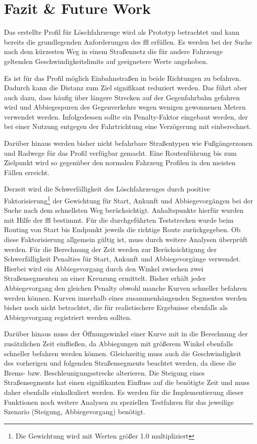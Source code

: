 \section{Fazit \& Future Work}

Das erstellte Profil für Löschfahrzeuge wird als Prototyp betrachtet und kann bereits die grundlegenden Anforderungen des \gls{ffl} erfüllen.
Es werden bei der Suche nach dem kürzesten Weg in einem Straßennetz die für andere Fahrzeuge geltenden Geschwindigkeitslimits auf geeignetere Werte angehoben.

Es ist für das Profil möglich Einbahnstraßen in beide Richtungen zu befahren.
Dadurch kann die Distanz zum Ziel signifikant reduziert werden.
Das führt aber auch dazu, dass häufig über längere Strecken auf der Gegenfahrbahn gefahren wird und Abbiegespuren des Gegenverkehrs wegen wenigen gewonnenen Metern verwendet werden.
Infolgedessen sollte ein Penalty-Faktor eingebaut werden, der bei einer Nutzung entgegen der Fahrtrichtung eine Verzögerung mit einberechnet.

Darüber hinaus werden bisher nicht befahrbare Straßentypen wie Fußgängerzonen und Radwege für das Profil verfügbar gemacht.
Eine Routenführung bis zum Zielpunkt wird so gegenüber den normalen Fahrzeug Profilen in den meisten Fällen erreicht.

Derzeit wird die Schwerfälligkeit des Löschfahrzeuges durch positive Faktorisierung\footnote{Die Gewichtung wird mit Werten größer 1.0 multipliziert} der Gewichtung für Start, Ankunft und Abbiegevorgängen bei der Suche nach dem schnellsten Weg berücksichtigt.
Anhaltspunkte hierfür wurden mit Hilfe der \gls{ffl} bestimmt.
Für die durchgeführten Teststrecken wurde beim Routing von Start bis Endpunkt jeweils die richtige Route zurückgegeben.
Ob diese Faktorisierung allgemein gültig ist, muss durch weitere Analysen überprüft werden.
Für die Berechnung der Zeit werden zur Berücksichtigung der Schwerfälligkeit Penalties für Start, Ankunft und Abbiegevorgänge verwendet.
Hierbei wird ein Abbiegevorgang durch den Winkel zwischen zwei Straßensegmenten an einer Kreuzung ermittelt.
Bisher erhält jeder Abbiegevorgang den gleichen Penalty obwohl manche Kurven schneller befahren werden können.
Kurven innerhalb eines zusammenhängenden Segmentes werden bisher noch nicht betrachtet, die für realistischere Ergebnisse ebenfalls als Abbiegevorgang registriert werden sollten.

Darüber hinaus muss der Öffnungswinkel einer Kurve mit in die Berechnung der zusätzlichen Zeit einfließen, da Abbiegungen mit größerem Winkel ebenfalls schneller befahren werden können.
Gleichzeitig muss auch die Geschwindigkeit des vorherigen und folgenden Straßensegments beachtet werden, da diese die Brems- bzw. Beschleunigungsstrecke alterieren.
Die Steigung eines Straßensegments hat einen signifikanten Einfluss auf die benötigte Zeit und muss daher ebenfalls einkalkuliert werden.
Es werden für die Implementierung dieser Funktionen noch weitere Analysen zu speziellen Testfahren für das jeweilige Szenario (Steigung, Abbiegevorgang) benötigt.

